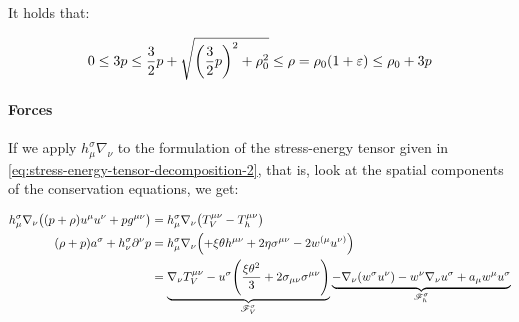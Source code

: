 \documentclass[main.tex]{subfiles}
\begin{document}
It holds \cite[]{Taub:1948} that:

\begin{equation}
0
\leq 3p
\leq \frac{3}{2}p + \sqrt{\qty(\frac{3}{2}p)^2 + \rho_0^2}
\leq \rho = \rho_0 (1 + \varepsilon)
\leq \rho_0 + 3p
\end{equation}

\paragraph{Forces}

If we apply \(h^\sigma_\mu \nabla_\nu\) to the formulation of the stress-energy tensor given in \eqref{eq:stress-energy-tensor-decomposition-2}, that is, look at the spatial components of the conservation equations, we get:

\begin{subequations}
\begin{align}
  h^\sigma_\mu \nabla_\nu \qty((p+\rho) u^\mu u^\nu + p g^{\mu\nu}) &=
  h^\sigma_\mu \nabla_\nu \qty(T^{\mu\nu}_V - T^{\mu\nu}_h)  \\
  (\rho + p) a^\sigma + h^\sigma_\nu \partial^\nu p &= h^\sigma_\mu \nabla_\nu \qty(
  +\xi \theta h^{\mu\nu} + 2 \eta \sigma^{\mu\nu} - 2w^{(\mu} u^{\nu)})  \\
  &= \underbrace{\nabla_\nu T^{\mu\nu}_V - u^\sigma \qty(\frac{\xi \theta^2}{3} +2 \sigma_{\mu\nu} \sigma^{\mu\nu})}_{\substack{\mathscr F ^\sigma _V}}
  \underbrace{ - \nabla_\nu (w^\sigma u^\nu) - w^\nu \nabla_\nu u^\sigma + a_\mu w^\mu u^\sigma  }_{\substack{\mathscr F ^\sigma _h}} \label{eq:full-spatial-equations-of-motion}
\end{align}
\end{subequations}
\end{document}
